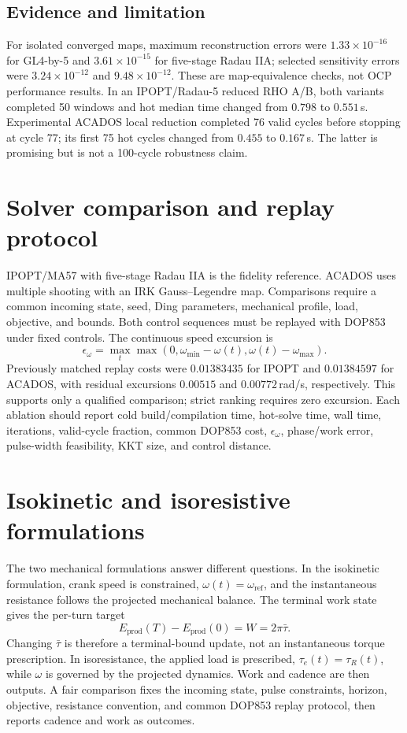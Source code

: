 \documentclass[10pt]{article}
\begin{document}
\subsection{Evidence and limitation}

For isolated converged maps, maximum reconstruction errors were $1.33\times10^{-16}$ for GL4-by-5 and $3.61\times10^{-15}$ for five-stage Radau IIA; selected sensitivity errors were $3.24\times10^{-12}$ and $9.48\times10^{-12}$. These are map-equivalence checks, not OCP performance results. In an IPOPT/Radau-5 reduced RHO A/B, both variants completed 50 windows and hot median time changed from $0.798$ to $0.551\,$s. Experimental ACADOS local reduction completed 76 valid cycles before stopping at cycle 77; its first 75 hot cycles changed from $0.455$ to $0.167\,$s. The latter is promising but is not a 100-cycle robustness claim.

\section{Solver comparison and replay protocol}

IPOPT/MA57 with five-stage Radau IIA is the fidelity reference. ACADOS uses multiple shooting with an IRK Gauss--Legendre map. Comparisons require a common incoming state, seed, Ding parameters, mechanical profile, load, objective, and bounds. Both control sequences must be replayed with DOP853 under fixed controls. The continuous speed excursion is
\[
\epsilon_\omega=\max_t\max\left(0,\omega_{\min}-\omega(t),\omega(t)-\omega_{\max}\right).
\]
Previously matched replay costs were $0.01383435$ for IPOPT and $0.01384597$ for ACADOS, with residual excursions $0.00515$ and $0.00772\,$rad/s, respectively. This supports only a qualified comparison; strict ranking requires zero excursion. Each ablation should report cold build/compilation time, hot-solve time, wall time, iterations, valid-cycle fraction, common DOP853 cost, $\epsilon_\omega$, phase/work error, pulse-width feasibility, KKT size, and control distance.

\section{Isokinetic and isoresistive formulations}

The two mechanical formulations answer different questions. In the isokinetic formulation, crank speed is constrained, $\omega(t)=\omega_{\mathrm{ref}}$, and the instantaneous resistance follows the projected mechanical balance. The terminal work state gives the per-turn target
\[
E_{\mathrm{prod}}(T)-E_{\mathrm{prod}}(0)=W=2\pi\bar\tau.
\]
Changing $\bar\tau$ is therefore a terminal-bound update, not an instantaneous torque prescription. In isoresistance, the applied load is prescribed, $\tau_e(t)=\tau_R(t)$, while $\omega$ is governed by the projected dynamics. Work and cadence are then outputs. A fair comparison fixes the incoming state, pulse constraints, horizon, objective, resistance convention, and common DOP853 replay protocol, then reports cadence and work as outcomes.
\end{document}

